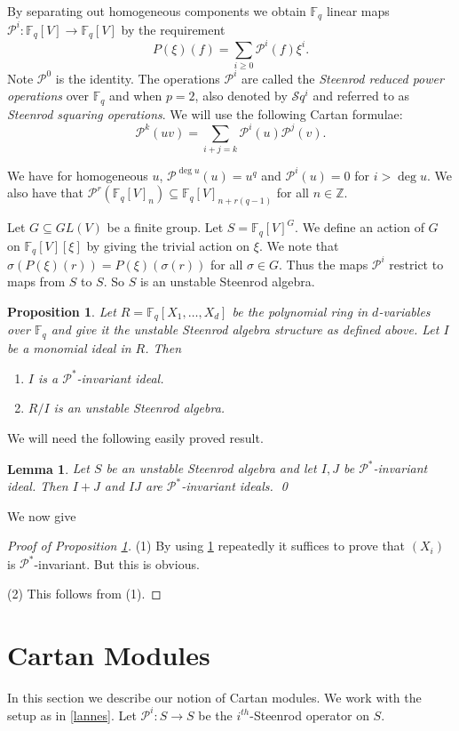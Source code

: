 \documentclass{amsart}
\newcommand{\F}{\mathbb{F} }
\newcommand{\Z}{\mathbb{Z} }
\newcommand{\Pc}{\mathcal{P} }
\newcommand{\rt}{\rightarrow}
\newcommand{\Sq}{\mathcal{S}{q}}
\theoremstyle{plain}
\newtheorem{lemma}[theorem]{Lemma}
\newtheorem{proposition}[theorem]{Proposition}
\theoremstyle{definition}
\theoremstyle{remark}
\begin{document}
By separating out homogeneous components we obtain $\F_q$ linear maps \\ $\Pc^i \colon \F_q[V] \rt \F_q[V]$ by the requirement
$$P(\xi)(f) = \sum_{i \geq 0}\Pc^i(f)\xi^i.$$
Note $\Pc^0$ is the identity.
The operations $\Pc^i$ are called the \emph{Steenrod reduced power operations} over $\F_q$ and when $p = 2$, also denoted by $\Sq^i$ and referred to as \emph{Steenrod squaring operations}.
We will use the following Cartan formulae:
$$\Pc^k(uv) = \sum_{i+j = k}\Pc^i(u)\Pc^j(v). $$

We  have for homogeneous $u$, $\Pc^{\deg u}(u) = u^q$ and $\Pc^{i}(u) =  0$ for $i > \deg u$.
We also have that $\Pc^r(\F_q[V]_n) \subseteq \F_q[V]_{n + r(q-1)}$ for all $n \in \Z$.

\s Let $G \subseteq GL(V)$ be a finite group. Let $S = \F_q[V]^G$. We define an action of $G$ on $\F_q[V][\xi]$ by giving the trivial action on $\xi$. We note that $\sigma(P(\xi)(r)) = P(\xi)(\sigma(r))$ for all $\sigma \in G$. Thus the maps $\Pc^i$ restrict to maps from $S$ to $S$. So $S$ is an unstable Steenrod algebra.

\begin{proposition}\label{s-mono}
Let $R = \F_q[X_1, \ldots, X_d]$ be the polynomial ring in $d$-variables over $\F_q$ and give it the unstable Steenrod algebra structure as defined above. Let $I$ be a monomial ideal in $R$. Then
\begin{enumerate}[\rm (1)]
  \item $I$ is a $\Pc^*$-invariant ideal.
  \item $R/I$ is an unstable Steenrod algebra.
\end{enumerate}
\end{proposition}
We will need the following easily proved result.
\begin{lemma}\label{sum-prd}
Let $S$ be an unstable Steenrod algebra and let $I, J$ be $\Pc^*$-invariant ideal. Then $I + J$ and $IJ$ are $\Pc^*$-invariant ideals. \qed
\end{lemma}
We now give
\begin{proof}[Proof of Proposition \ref{s-mono}]
(1) By using \ref{sum-prd} repeatedly it suffices to prove that $(X_i)$ is  $\Pc^*$-invariant. But this is obvious.

(2) This follows from (1).
\end{proof}
\section{Cartan Modules}
In this section we describe our notion of Cartan modules. We work with the setup as in \ref{lannes}. Let $\Pc^i \colon S \rt S$ be the $i^{th}$-Steenrod operator on $S$.
\end{document}
